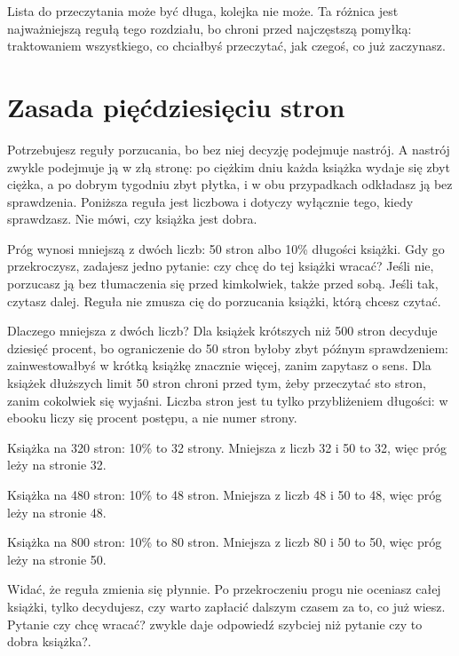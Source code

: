 Lista do przeczytania może być długa, kolejka nie może. Ta różnica jest najważniejszą regułą tego rozdziału, bo chroni przed najczęstszą pomyłką: traktowaniem wszystkiego, co chciałbyś przeczytać, jak czegoś, co już zaczynasz.

\section{Zasada pięćdziesięciu stron}

Potrzebujesz reguły porzucania, bo bez niej decyzję podejmuje nastrój. A nastrój zwykle podejmuje ją w złą stronę: po ciężkim dniu każda książka wydaje się zbyt ciężka, a po dobrym tygodniu zbyt płytka, i w obu przypadkach odkładasz ją bez sprawdzenia. Poniższa reguła jest liczbowa i dotyczy wyłącznie tego, kiedy sprawdzasz. Nie mówi, czy książka jest dobra.

\begin{zasada}
  Próg wynosi mniejszą z dwóch liczb: 50 stron albo 10\% długości książki. Gdy go przekroczysz, zadajesz jedno pytanie: czy chcę do tej książki wracać? Jeśli nie, porzucasz ją bez tłumaczenia się przed kimkolwiek, także przed sobą. Jeśli tak, czytasz dalej. Reguła nie zmusza cię do porzucania książki, którą chcesz czytać.
\end{zasada}

Dlaczego mniejsza z dwóch liczb? Dla książek krótszych niż 500 stron decyduje dziesięć procent, bo ograniczenie do 50 stron byłoby zbyt późnym sprawdzeniem: zainwestowałbyś w krótką książkę znacznie więcej, zanim zapytasz o sens. Dla książek dłuższych limit 50 stron chroni przed tym, żeby przeczytać sto stron, zanim cokolwiek się wyjaśni. Liczba stron jest tu tylko przybliżeniem długości: w ebooku liczy się procent postępu, a nie numer strony.

\begin{przyklad}
  Książka na 320 stron: 10\% to 32 strony. Mniejsza z liczb 32 i 50 to 32, więc próg leży na stronie 32.

  Książka na 480 stron: 10\% to 48 stron. Mniejsza z liczb 48 i 50 to 48, więc próg leży na stronie 48.

  Książka na 800 stron: 10\% to 80 stron. Mniejsza z liczb 80 i 50 to 50, więc próg leży na stronie 50.
\end{przyklad}

Widać, że reguła zmienia się płynnie. Po przekroczeniu progu nie oceniasz całej książki, tylko decydujesz, czy warto zapłacić dalszym czasem za to, co już wiesz. Pytanie \glqq czy chcę wracać?\grqq{} zwykle daje odpowiedź szybciej niż pytanie \glqq czy to dobra książka?\grqq{}.

